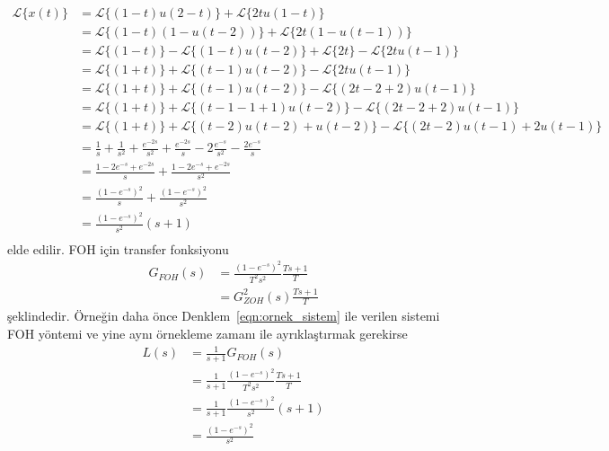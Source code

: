 \begin{equation}
\begin{split}
    \mathcal{L}\{x(t)\}&=\mathcal{L}\{(1-t)u(2-t)\}+\mathcal{L}\{2tu(1-t)\}\\
    &=\mathcal{L}\{(1-t)(1-u(t-2))\}+\mathcal{L}\{2t(1-u(t-1))\}\\
    &=\mathcal{L}\{(1-t)\}-\mathcal{L}\{(1-t)u(t-2)\}+\mathcal{L}\{2t\}-\mathcal{L}\{2tu(t-1)\}\\
    &=\mathcal{L}\{(1+t)\}+\mathcal{L}\{(t-1)u(t-2)\}-\mathcal{L}\{2tu(t-1)\}\\
    &=\mathcal{L}\{(1+t)\}+\mathcal{L}\{(t-1)u(t-2)\}-\mathcal{L}\{(2t-2+2)u(t-1)\}\\
    &=\mathcal{L}\{(1+t)\}+\mathcal{L}\{(t-1-1+1)u(t-2)\}-\mathcal{L}\{(2t-2+2)u(t-1)\}\\
    &=\mathcal{L}\{(1+t)\}+\mathcal{L}\{(t-2)u(t-2)+u(t-2)\}-\mathcal{L}\{(2t-2)u(t-1)+2u(t-1)\}\\
    &=\frac{1}{s}+\frac{1}{s^2}+\frac{e^{-2s}}{s^2}+\frac{e^{-2s}}{s}-2\frac{e^{-s}}{s^2}-\frac{2e^{-s}}{s}\\
    &=\frac{1-2e^{-s}+e^{-2s}}{s}+\frac{1-2e^{-s}+e^{-2s}}{s^2}\\
    &=\frac{(1-e^{-s})^2}{s}+\frac{(1-e^{-s})^2}{s^2}\\
    &=\frac{(1-e^{-s})^2}{s^2}(s+1)\\
\end{split}
\end{equation}
elde edilir. FOH için transfer fonksiyonu
\begin{equation}
    \begin{split}
        G_{FOH}(s)&=\frac{(1-e^{-s})^2}{T^2s^2}\frac{Ts+1}{T}\\
        &=G_{ZOH}^2(s)\frac{Ts+1}{T}
\end{split}
\end{equation}
şeklindedir. Örneğin daha önce Denklem~\ref{eqn:ornek_sistem} ile verilen sistemi FOH yöntemi ve yine aynı örnekleme zamanı ile ayrıklaştırmak gerekirse
\begin{equation}
\begin{split}
    L(s)&=\frac{1}{s+1}G_{FOH}(s)\\
    &=\frac{1}{s+1}\frac{(1-e^{-s})^2}{T^2s^2}\frac{Ts+1}{T}\\
    &=\frac{1}{s+1}\frac{(1-e^{-s})^2}{s^2}(s+1)\\
    &=\frac{(1-e^{-s})^2}{s^2}
\end{split}
\end{equation}
